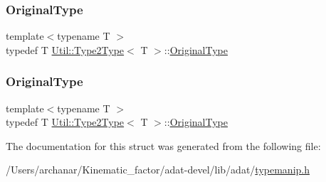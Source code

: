 \subsubsection{\texorpdfstring{OriginalType}{OriginalType}\hspace{0.1cm}{\footnotesize\ttfamily [2/3]}}
{\footnotesize\ttfamily template$<$typename T $>$ \\
typedef T \mbox{\hyperlink{structUtil_1_1Type2Type}{Util\+::\+Type2\+Type}}$<$ T $>$\+::\mbox{\hyperlink{structUtil_1_1Type2Type_a053c4160c945f1588beb737bb6e952d1}{Original\+Type}}}

\mbox{\label{structUtil_1_1Type2Type_a053c4160c945f1588beb737bb6e952d1}} 
\subsubsection{\texorpdfstring{OriginalType}{OriginalType}\hspace{0.1cm}{\footnotesize\ttfamily [3/3]}}
{\footnotesize\ttfamily template$<$typename T $>$ \\
typedef T \mbox{\hyperlink{structUtil_1_1Type2Type}{Util\+::\+Type2\+Type}}$<$ T $>$\+::\mbox{\hyperlink{structUtil_1_1Type2Type_a053c4160c945f1588beb737bb6e952d1}{Original\+Type}}}



The documentation for this struct was generated from the following file\+:\begin{DoxyCompactItemize}
\item 
/\+Users/archanar/\+Kinematic\+\_\+factor/adat-\/devel/lib/adat/\mbox{\hyperlink{adat-devel_2lib_2adat_2typemanip_8h}{typemanip.\+h}}\end{DoxyCompactItemize}
